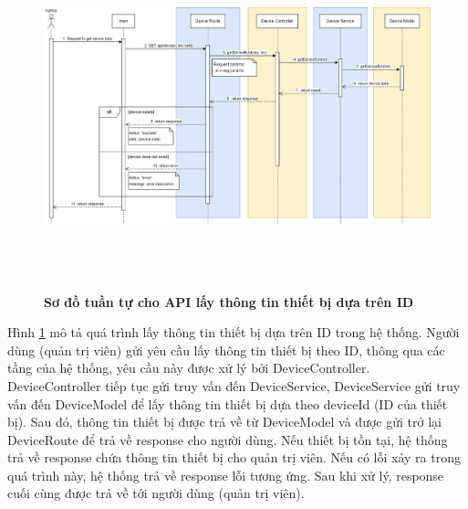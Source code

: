 \begin{figure}[H]
  \centering
  \includegraphics[width=16cm,height=10cm]{Images/sequence_api/getDeviceById.png}
  \caption[Sơ đồ tuần tự cho API lấy thông tin thiết bị dựa trên ID]{\bfseries \fontsize{12pt}{0pt}
  \selectfont Sơ đồ tuần tự cho API lấy thông tin thiết bị dựa trên ID }
  \label{getDeviceById} %
\end{figure}
Hình \ref{getDeviceById} mô tả quá trình lấy thông tin thiết bị dựa trên ID trong hệ thống. Người dùng (quản trị viên) gửi yêu cầu lấy thông tin thiết bị theo ID, thông qua các tầng của hệ thống, 
yêu cầu này được xử lý bởi DeviceController. DeviceController tiếp tục gửi truy vấn đến DeviceService, DeviceService gửi truy vấn đến DeviceModel để lấy thông tin thiết bị dựa theo deviceId (ID của thiết bị). 
Sau đó, thông tin thiết bị được trả về từ DeviceModel và được gửi trở lại DeviceRoute để trả về response cho người dùng. Nếu thiết bị tồn tại, hệ thống trả về response chứa thông tin thiết bị cho quản trị viên. Nếu có lỗi xảy ra trong quá trình này, hệ thống trả về response lỗi tương ứng. 
Sau khi xử lý, response cuối cùng được trả về tới người dùng (quản trị viên).

